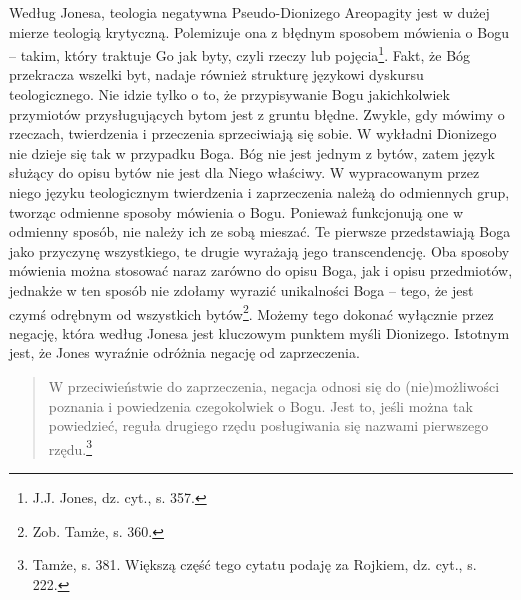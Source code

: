 Według Jonesa, teologia negatywna Pseudo-Dionizego Areopagity jest w
dużej mierze teologią krytyczną. Polemizuje ona z błędnym sposobem
mówienia o Bogu -- takim, który traktuje Go jak byty, czyli rzeczy lub
pojęcia\footnote{J.J. Jones, dz. cyt., s. 357. }. Fakt, że Bóg
przekracza wszelki byt, nadaje również strukturę językowi dyskursu
teologicznego. Nie idzie tylko o to, że przypisywanie Bogu
jakichkolwiek przymiotów przysługujących bytom jest z gruntu błędne.
Zwykle, gdy mówimy o rzeczach, twierdzenia i przeczenia sprzeciwiają
się sobie. W wykładni Dionizego nie dzieje się tak w przypadku Boga.
Bóg nie jest jednym z bytów, zatem język służący do opisu bytów nie
jest dla Niego właściwy. W wypracowanym przez niego języku teologicznym
twierdzenia i zaprzeczenia należą do odmiennych grup, tworząc odmienne
sposoby mówienia o Bogu. Ponieważ funkcjonują one w odmienny sposób,
nie należy ich ze sobą mieszać. Te pierwsze przedstawiają Boga jako
przyczynę wszystkiego, te drugie wyrażają jego transcendencję. Oba
sposoby mówienia można stosować naraz zarówno do opisu Boga, jak i
opisu przedmiotów, jednakże w ten sposób nie zdołamy wyrazić
unikalności Boga -- tego, że jest czymś odrębnym od wszystkich
bytów\footnote{Zob. Tamże, s. 360. }. Możemy tego dokonać
wyłącznie przez negację, która według Jonesa jest kluczowym punktem
myśli Dionizego. Istotnym jest, że Jones wyraźnie odróżnia negację od
zaprzeczenia.


\begin{quote}
        W przeciwieństwie do zaprzeczenia, negacja odnosi się do (nie)możliwości
poznania i powiedzenia czegokolwiek o Bogu. Jest to, jeśli można tak
powiedzieć, reguła drugiego rzędu posługiwania się nazwami pierwszego
rzędu.\footnote{Tamże, s. 381. Większą część tego cytatu podaję za
Rojkiem, dz. cyt., s. 222. }
\end{quote}






